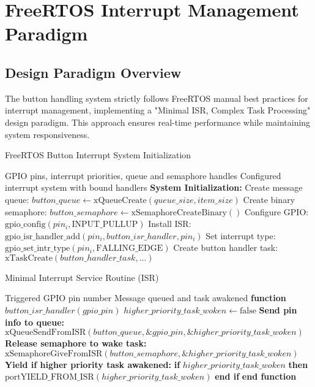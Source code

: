 \documentclass{article}
\begin{document}
\section{FreeRTOS Interrupt Management Paradigm}

\subsection{Design Paradigm Overview}

The button handling system strictly follows FreeRTOS manual best practices for interrupt management, implementing a "Minimal ISR, Complex Task Processing" design paradigm. This approach ensures real-time performance while maintaining system responsiveness.

\begin{algorithm}
\caption{FreeRTOS Button Interrupt System Initialization}
\label{alg:interrupt_init}
\begin{algorithmic}[1]
\REQUIRE GPIO pins, interrupt priorities, queue and semaphore handles
\ENSURE Configured interrupt system with bound handlers
\STATE \textbf{System Initialization:}
\STATE Create message queue: $button\_queue \leftarrow \text{xQueueCreate}(queue\_size, item\_size)$
\STATE Create binary semaphore: $button\_semaphore \leftarrow \text{xSemaphoreCreateBinary}()$
\STATE
{}
    \STATE Configure GPIO: $\text{gpio\_config}(pin_i, \text{INPUT\_PULLUP})$
    \STATE Install ISR: $\text{gpio\_isr\_handler\_add}(pin_i, button\_isr\_handler, pin_i)$
    \STATE Set interrupt type: $\text{gpio\_set\_intr\_type}(pin_i, \text{FALLING\_EDGE})$
\ENDFOR
\STATE
\STATE Create button handler task: $\text{xTaskCreate}(button\_handler\_task, ...)$
\end{algorithmic}
\end{algorithm}

\begin{algorithm}
\caption{Minimal Interrupt Service Routine (ISR)}
\label{alg:minimal_isr}
\begin{algorithmic}[1]
\REQUIRE Triggered GPIO pin number
\ENSURE Message queued and task awakened
\STATE \textbf{function} $button\_isr\_handler(gpio\_pin)$
\STATE \quad $higher\_priority\_task\_woken \leftarrow \text{false}$
\STATE \quad \textbf{Send pin info to queue:}
\STATE \quad $\text{xQueueSendFromISR}(button\_queue, \&gpio\_pin, \&higher\_priority\_task\_woken)$
\STATE \quad \textbf{Release semaphore to wake task:}
\STATE \quad $\text{xSemaphoreGiveFromISR}(button\_semaphore, \&higher\_priority\_task\_woken)$
\STATE \quad \textbf{Yield if higher priority task awakened:}
\STATE \quad \textbf{if} $higher\_priority\_task\_woken$ \textbf{then}
\STATE \quad \quad $\text{portYIELD\_FROM\_ISR}(higher\_priority\_task\_woken)$
\STATE \quad \textbf{end if}
\STATE \textbf{end function}
\end{algorithmic}
\end{algorithm}
\end{document}
